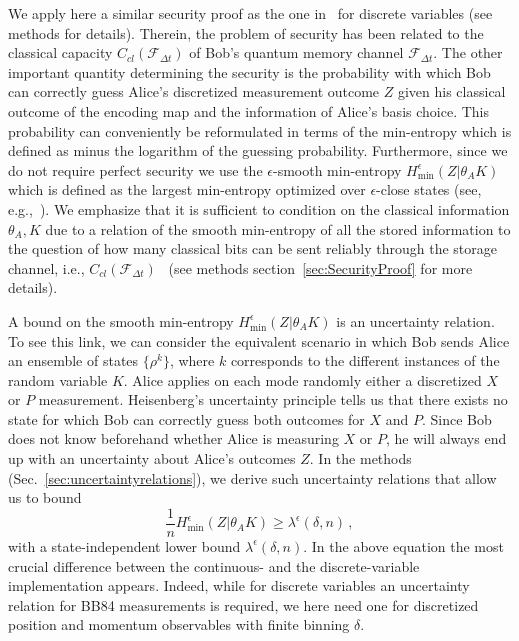 \documentclass[aps,amsfonts,twoside,amssymb,superscriptaddress,twocolumn]{revtex4-1}
\newcommand*{\cF}{\mathcal{F}}
\begin{document}
We apply here a similar security proof as the one in~\cite{Koenig2012,schaffner2010} for discrete variables (see methods for details). Therein, the problem of security has been related to the classical capacity $C_{cl}(\cF_{\Delta t})$ of Bob's quantum memory channel $\cF_{\Delta t}$. The other important quantity determining the security is the probability with which Bob can correctly guess Alice's discretized measurement outcome $Z$ given his classical outcome of the encoding map and the information of Alice's basis choice. This probability can conveniently be reformulated in terms of the min-entropy which is defined as minus the logarithm of the guessing probability. Furthermore, since we do not require perfect security we use the $\epsilon$-smooth min-entropy $H^\epsilon_{\min}(Z|\theta_A K)$ which is defined as the largest min-entropy optimized over $\epsilon$-close states (see, e.g.,~\cite{tomamichelBook2015}). We emphasize that it is sufficient to condition on the classical information $\theta_A, K$ due to a relation of the smooth min-entropy of all the stored information to the question of how many classical bits can be sent reliably through the storage channel, i.e., $C_{cl}(\cF_{\Delta t})$~\cite{Koenig2012} (see methods section~\ref{sec:SecurityProof} for more details).

A bound on the smooth min-entropy $H^\epsilon_{\min}(Z|\theta_A K)$ is an uncertainty relation. To see this link, we can consider the equivalent scenario in which Bob sends Alice an ensemble of states $\{\rho^k\}$, where $k$ corresponds to the different instances of the random variable $K$. Alice applies on each mode randomly either a discretized $X$ or $P$ measurement. Heisenberg's uncertainty principle tells us that there exists no state for which Bob can correctly guess both outcomes for $X$ and $P$. Since Bob does not know beforehand whether Alice is measuring $X$ or $P$, he will always end up with an uncertainty about Alice's outcomes $Z$. In the methods (Sec.~\ref{sec:uncertaintyrelations}), we derive such uncertainty relations that allow us to bound 
\begin{equation}\label{eq:URdef}
\frac 1n H^\epsilon_{\min}(Z|\theta_A K) \geq \lambda^\epsilon (\delta,n) \, , 
\end{equation}
with a state-independent lower bound $\lambda^\epsilon (\delta,n) $.
In the above equation the most crucial difference between the continuous- and the discrete-variable implementation appears. Indeed, while for discrete variables an uncertainty relation for BB84 measurements is required, we here need one for discretized position and momentum observables with finite binning $\delta$.  
\end{document}
